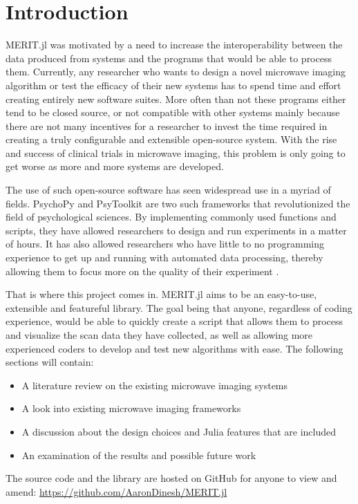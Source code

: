 \chapter*{Introduction}
MERIT.jl was motivated by a need to increase the interoperability between the data produced from systems and the
programs that would be able to process them. Currently, any researcher who wants to design a novel microwave imaging
algorithm or test the efficacy of their new systems has to spend time and effort creating entirely new software suites.
More often than not these programs either tend to be closed source, or not compatible with other systems mainly because
there are not many incentives for a researcher to invest the time required in creating a truly configurable and
extensible open-source system. With the rise and success of clinical trials in microwave imaging, this problem is only
going to get worse as more and more systems are developed.  \hfill \break

The use of such open-source software has seen widespread use in a myriad of fields. PsychoPy and PsyToolkit are two such
frameworks that revolutionized the field of psychological sciences. By implementing commonly used functions and scripts,
they have allowed researchers to design and run experiments in a matter of hours. It has also allowed researchers who
have little to no programming experience to get up and running with automated data processing, thereby allowing them to
focus more on the quality of their experiment \cite{stoetPsyToolkitTestimonials}. \hfill \break

That is where this project comes in. MERIT.jl aims to be an easy-to-use, extensible and featureful library. The goal
being that anyone, regardless of coding experience, would be able to quickly create a script that allows them to process
and visualize the scan data they have collected, as well as allowing more experienced coders to develop and test new
algorithms with ease. The following sections will contain: 

\begin{itemize}
    \item A literature review on the existing microwave imaging systems
    \item A look into existing microwave imaging frameworks
    \item A discussion about the design choices and Julia features that are included
    \item An examination of the results and possible future work
\end{itemize}

The source code and the library are hosted on GitHub for anyone to view and amend:
\url{https://github.com/AaronDinesh/MERIT.jl}
